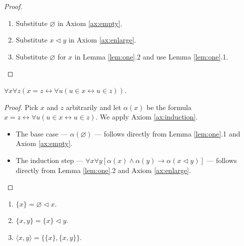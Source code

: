 \begin{proof}
    \leanok
    \leavevmode
    \begin{enumerate}
        \item Substitute $\varnothing$ in Axiom \ref{ax:empty}.
        \item Substitute $x \lhd y$ in Axiom \ref{ax:enlarge}.
        \item Substitute $\varnothing$ for $x$ in Lemma \ref{lem:one}.2 and use Lemma \ref{lem:one}.1.
    \end{enumerate}
\end{proof}

\begin{theorem}
    \label{thm:exten_prop}
    \leanok
    $\forall x \forall z (x=z \leftrightarrow \forall u (u \in x \leftrightarrow u \in z))$.
\end{theorem}

\begin{proof}
    \leanok
    Pick $x$ and $z$ arbitrarily and let $\alpha (x)$ be the formula $x=z \leftrightarrow \forall u (u \in x \leftrightarrow u \in z)$.
    We apply Axiom \ref{ax:induction}.
    \begin{itemize}
        \item The base case — $\alpha (\varnothing)$ — follows directly from Lemma \ref{lem:one}.1 and Axiom \ref{ax:empty}.
        \item The induction step — $\forall x \forall y[\alpha(x) \land \alpha(y) \rightarrow \alpha(x \lhd y)]$ — 
        follows directly from Lemma \ref{lem:one}.2 and Axiom \ref{ax:enlarge}.
    \end{itemize}
\end{proof}

\begin{notation*}
    \label{not:single_pairs}
    \leanok
    \leavevmode \normalfont
    \begin{enumerate}
        \item $\{x\} = \varnothing \lhd x$.
        \item $\{x,y\} = \{x\} \lhd y$.
        \item $\langle x,y\rangle = \{\{x\}, \{x,y\}\}$.
    \end{enumerate}
\end{notation*}


